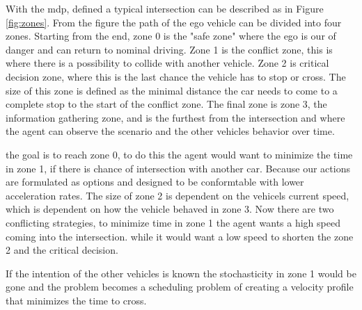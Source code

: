 With the \gls{mdp}, defined a typical intersection can be described as in Figure \ref{fig:zones}. From the figure the path of the ego vehicle can be divided into four zones. Starting from the end, zone 0 is the "safe zone" where the ego is our of danger and can return to nominal driving. Zone 1 is the conflict zone, this is where there is a possibility to collide with another vehicle. Zone 2 is critical decision zone, where this is the last chance the vehicle has to stop or cross. The size of this zone is defined as the minimal distance the car needs to come to a complete stop to the start of the conflict zone. The final zone is zone 3, the information gathering zone, and is the furthest from the intersection and where the agent can observe the scenario and the other vehicles behavior over time. 

the goal is to reach zone 0, 
to do this the agent would want to minimize the time in zone 1, if there is chance of intersection with another car.
Because our actions are formulated as options and designed to be conformtable with lower acceleration rates. The size of zone 2 is dependent on the vehicels current speed, which is dependent on how the vehicle behaved in zone 3. 
Now there are two conflicting strategies, to minimize time in zone 1 the agent wants a high speed coming into the intersection. while it would want a low speed to shorten the zone 2 and the critical decision. 

If the intention of the other vehicles is known the stochasticity in zone 1 would be gone and the problem becomes a scheduling problem of creating a velocity profile that minimizes the time to cross.  


